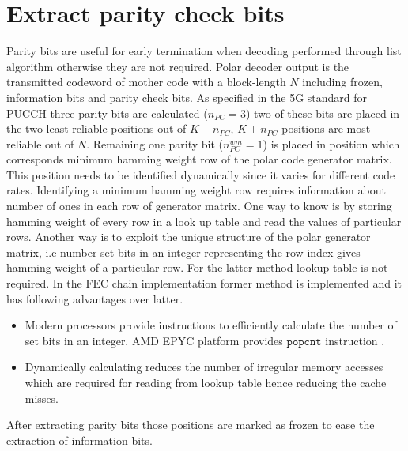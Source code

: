 \section{Extract parity check bits}
Parity bits are useful for early termination when decoding performed through list algorithm otherwise they are not required. Polar decoder output is the transmitted codeword of mother code with a block-length $N$ including frozen, information bits and parity check bits. As specified in the 5G standard \cite{3gpp.38.212} for PUCCH three parity bits are calculated ($n_{PC} = 3$) two of these bits are placed in the two least reliable positions out of $K+n_{PC}$, $K+n_{PC}$ positions are most reliable out of $N$. Remaining one parity bit ($ n_{PC}^{wm} = 1 $) is placed in position which corresponds minimum hamming weight row of the polar code generator matrix. This position needs to be identified dynamically since it varies for different code rates. Identifying a minimum hamming weight row requires information about number of ones in each row of generator matrix. One way to know is by storing hamming weight of every row in a look up table and read the values of particular rows. Another way is to exploit the unique structure of the polar generator matrix, i.e number set bits in an integer representing the row index gives hamming weight of a particular row. For the latter method lookup table is not required. In the FEC chain implementation former method is implemented and it has following advantages over latter.

\begin{itemize}  
	\item Modern processors provide instructions to efficiently calculate the number of set bits in an integer. AMD EPYC platform provides $\mathtt{popcnt}$ instruction \cite{AgnerFog}.
	\item Dynamically calculating reduces the number of irregular memory accesses which are required for reading from lookup table hence reducing the cache misses.
\end{itemize}

After extracting parity bits those positions are marked as frozen to ease the extraction of information bits.

